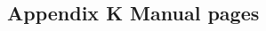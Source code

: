 \documentclass[class=book, crop=false]{standalone}
\begin{document}
\begin{CJK}{UTF8}{gbsn}

\chapter*{Appendix K Manual pages}



\cleardoublepage

\end{CJK}
\end{document}
